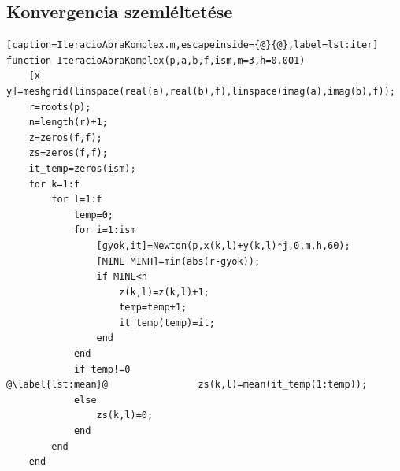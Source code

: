 \documentclass[a4paper,12pt]{report}
\begin{document}
\begin{appendices}
    
    
    
    
    
    
    
    
    


		\section{Konvergencia szemléltetése} \label{Konvergencia}
			\begin{singlespace}
            \begin{lstlisting}[caption=IteracioAbraKomplex.m,escapeinside={@}{@},label=lst:iter]
function IteracioAbraKomplex(p,a,b,f,ism,m=3,h=0.001)                               
    [x y]=meshgrid(linspace(real(a),real(b),f),linspace(imag(a),imag(b),f));
    r=roots(p);                                                             
    n=length(r)+1;                                                          
    z=zeros(f,f);                                                           
    zs=zeros(f,f);                                                          
    it_temp=zeros(ism);                                                     
    for k=1:f                                                               
        for l=1:f                                                           
            temp=0;                                                         
            for i=1:ism                                                     
                [gyok,it]=Newton(p,x(k,l)+y(k,l)*j,0,m,h,60);               
                [MINE MINH]=min(abs(r-gyok));                               
                if MINE<h                                                   
                    z(k,l)=z(k,l)+1;                                        
                    temp=temp+1;                                            
                    it_temp(temp)=it;                                       
                end                                                         
            end                                                             
            if temp!=0                                                      
@\label{lst:mean}@                zs(k,l)=mean(it_temp(1:temp)); 
            else                                                            
                zs(k,l)=0;                                                  
            end                                                             
        end                                                                 
    end                                                            

\end{lstlisting}
\end{singlespace}
\end{appendices}
\end{document}
